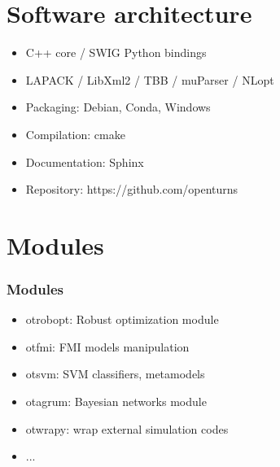 \documentclass{beamer}
\begin{document}

\section{Software architecture}

\begin{frame}[containsverbatim]

\begin{itemize}
\item C++ core / SWIG Python bindings
\item LAPACK / LibXml2 / TBB / muParser / NLopt
\item Packaging: Debian, Conda, Windows
\item Compilation: cmake
\item Documentation: Sphinx
\item Repository: https://github.com/openturns
\end{itemize}

\end{frame}


\section{Modules}

\begin{frame}[containsverbatim]
\frametitle{Modules}

\begin{itemize}
\item otrobopt: Robust optimization module

\item otfmi: FMI models manipulation

\item otsvm: SVM classifiers, metamodels

\item otagrum: Bayesian networks module

\item otwrapy: wrap external simulation codes

\item ...
\end{itemize}

\end{frame}
\end{document}
